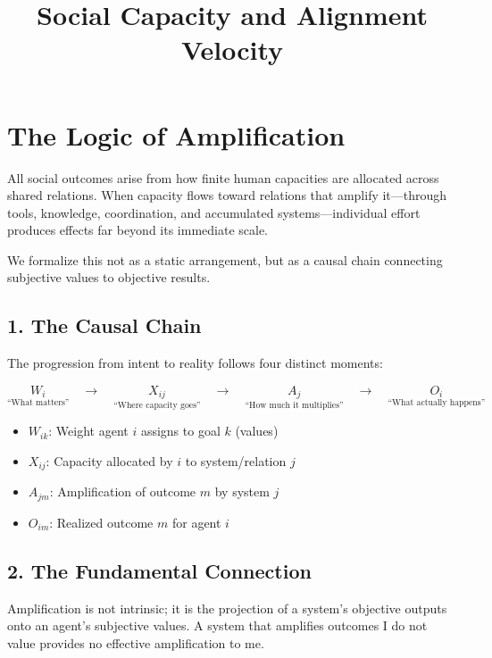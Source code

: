 \documentclass{article}
\title{\textbf{\sffamily Social Capacity and Alignment Velocity}}
\author{}
\date{}
\begin{document}
\maketitle

\section*{The Logic of Amplification}

All social outcomes arise from how finite human capacities are allocated across shared relations. When capacity flows toward relations that amplify it—through tools, knowledge, coordination, and accumulated systems—individual effort produces effects far beyond its immediate scale.

We formalize this not as a static arrangement, but as a causal chain connecting subjective values to objective results.

\subsection*{1. The Causal Chain}

The progression from intent to reality follows four distinct moments:

\[
\underset{\text{``What matters''}}{W_i} 
\quad\xrightarrow{\quad}\quad 
\underset{\text{``Where capacity goes''}}{X_{ij}} 
\quad\xrightarrow{\quad}\quad 
\underset{\text{``How much it multiplies''}}{A_j} 
\quad\xrightarrow{\quad}\quad 
\underset{\text{``What actually happens''}}{O_i}
\]

\begin{itemize}[label=--]
    \setlength\itemsep{0em}
    \item $W_{ik}$: Weight agent $i$ assigns to goal $k$ (values)
    \item $X_{ij}$: Capacity allocated by $i$ to system/relation $j$
    \item $A_{jm}$: Amplification of outcome $m$ by system $j$
    \item $O_{im}$: Realized outcome $m$ for agent $i$
\end{itemize}

\subsection*{2. The Fundamental Connection}

Amplification is not intrinsic; it is the projection of a system's objective outputs onto an agent's subjective values. A system that amplifies outcomes I do not value provides no effective amplification to me.
\end{document}
